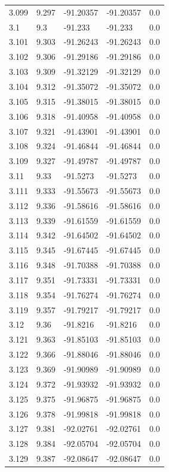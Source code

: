 \begin{tabular}{lllll}
3.099 & 9.297 & -91.20357 & -91.20357 & 0.0 \\
3.1 & 9.3 & -91.233 & -91.233 & 0.0 \\
3.101 & 9.303 & -91.26243 & -91.26243 & 0.0 \\
3.102 & 9.306 & -91.29186 & -91.29186 & 0.0 \\
3.103 & 9.309 & -91.32129 & -91.32129 & 0.0 \\
3.104 & 9.312 & -91.35072 & -91.35072 & 0.0 \\
3.105 & 9.315 & -91.38015 & -91.38015 & 0.0 \\
3.106 & 9.318 & -91.40958 & -91.40958 & 0.0 \\
3.107 & 9.321 & -91.43901 & -91.43901 & 0.0 \\
3.108 & 9.324 & -91.46844 & -91.46844 & 0.0 \\
3.109 & 9.327 & -91.49787 & -91.49787 & 0.0 \\
3.11 & 9.33 & -91.5273 & -91.5273 & 0.0 \\
3.111 & 9.333 & -91.55673 & -91.55673 & 0.0 \\
3.112 & 9.336 & -91.58616 & -91.58616 & 0.0 \\
3.113 & 9.339 & -91.61559 & -91.61559 & 0.0 \\
3.114 & 9.342 & -91.64502 & -91.64502 & 0.0 \\
3.115 & 9.345 & -91.67445 & -91.67445 & 0.0 \\
3.116 & 9.348 & -91.70388 & -91.70388 & 0.0 \\
3.117 & 9.351 & -91.73331 & -91.73331 & 0.0 \\
3.118 & 9.354 & -91.76274 & -91.76274 & 0.0 \\
3.119 & 9.357 & -91.79217 & -91.79217 & 0.0 \\
3.12 & 9.36 & -91.8216 & -91.8216 & 0.0 \\
3.121 & 9.363 & -91.85103 & -91.85103 & 0.0 \\
3.122 & 9.366 & -91.88046 & -91.88046 & 0.0 \\
3.123 & 9.369 & -91.90989 & -91.90989 & 0.0 \\
3.124 & 9.372 & -91.93932 & -91.93932 & 0.0 \\
3.125 & 9.375 & -91.96875 & -91.96875 & 0.0 \\
3.126 & 9.378 & -91.99818 & -91.99818 & 0.0 \\
3.127 & 9.381 & -92.02761 & -92.02761 & 0.0 \\
3.128 & 9.384 & -92.05704 & -92.05704 & 0.0 \\
3.129 & 9.387 & -92.08647 & -92.08647 & 0.0 \\

\end{tabular}
